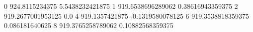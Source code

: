 0 924.8115234375 5.5438232421875
1 919.6538696289062 0.38616943359375
2 919.2677001953125 0.0
4 919.1357421875 -0.1319580078125
6 919.3538818359375 0.086181640625
8 919.3765258789062 0.10882568359375
